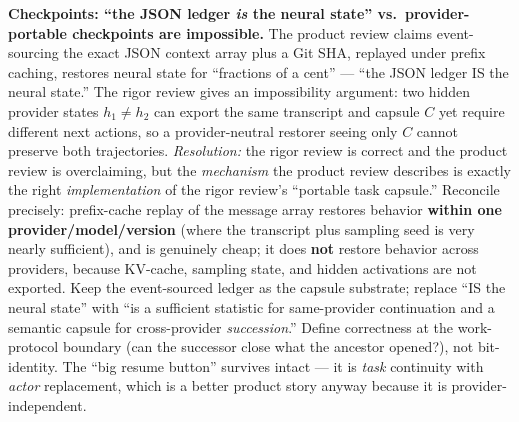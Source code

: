 \documentclass[11pt,a4paper]{article}
\begin{document}
\begin{adj}\textbf{Checkpoints: ``the JSON ledger \emph{is} the neural state'' vs.\ provider-portable checkpoints are impossible.} The product review claims event-sourcing the exact JSON context array plus a Git SHA, replayed under prefix caching, restores neural state for ``fractions of a cent'' --- ``the JSON ledger IS the neural state.'' The rigor review gives an impossibility argument: two hidden provider states $h_1\neq h_2$ can export the same transcript and capsule $C$ yet require different next actions, so a provider-neutral restorer seeing only $C$ cannot preserve both trajectories. \emph{Resolution:} the rigor review is correct and the product review is overclaiming, but the \emph{mechanism} the product review describes is exactly the right \emph{implementation} of the rigor review's ``portable task capsule.'' Reconcile precisely: prefix-cache replay of the message array restores behavior \textbf{within one provider/model/version} (where the transcript plus sampling seed is very nearly sufficient), and is genuinely cheap; it does \textbf{not} restore behavior across providers, because KV-cache, sampling state, and hidden activations are not exported. Keep the event-sourced ledger as the capsule substrate; replace ``IS the neural state'' with ``is a sufficient statistic for same-provider continuation and a semantic capsule for cross-provider \emph{succession}.'' Define correctness at the work-protocol boundary (can the successor close what the ancestor opened?), not bit-identity. The ``big resume button'' survives intact --- it is \emph{task} continuity with \emph{actor} replacement, which is a better product story anyway because it is provider-independent.
\end{adj}
\end{document}
